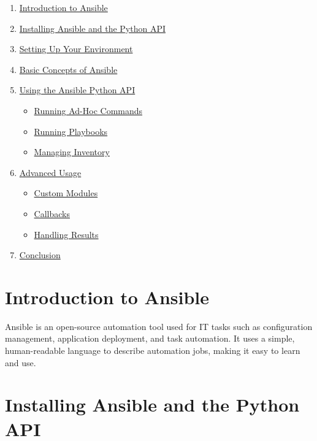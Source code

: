 \documentclass[
  letterpaper,
  DIV=11,
  numbers=noendperiod]{scrreprt}
\providecommand{\tightlist}{%
  \setlength{\itemsep}{0pt}\setlength{\parskip}{0pt}}\usepackage{longtable,booktabs,array}
\begin{document}
\begin{enumerate}
\def\labelenumi{\arabic{enumi}.}
\tightlist
\item
  \hyperref[introduction-to-ansible]{Introduction to Ansible}
\item
  \hyperref[installing-ansible-and-the-python-api]{Installing Ansible
  and the Python API}
\item
  \hyperref[setting-up-your-environment]{Setting Up Your Environment}
\item
  \hyperref[basic-concepts-of-ansible]{Basic Concepts of Ansible}
\item
  \hyperref[using-the-ansible-python-api]{Using the Ansible Python API}

  \begin{itemize}
  \tightlist
  \item
    \hyperref[running-ad-hoc-commands]{Running Ad-Hoc Commands}
  \item
    \hyperref[running-playbooks]{Running Playbooks}
  \item
    \hyperref[managing-inventory]{Managing Inventory}
  \end{itemize}
\item
  \hyperref[advanced-usage]{Advanced Usage}

  \begin{itemize}
  \tightlist
  \item
    \hyperref[custom-modules]{Custom Modules}
  \item
    \hyperref[callbacks]{Callbacks}
  \item
    \hyperref[handling-results]{Handling Results}
  \end{itemize}
\item
  \hyperref[conclusion]{Conclusion}
\end{enumerate}

\section{Introduction to Ansible}\label{introduction-to-ansible}

Ansible is an open-source automation tool used for IT tasks such as
configuration management, application deployment, and task automation.
It uses a simple, human-readable language to describe automation jobs,
making it easy to learn and use.

\section{Installing Ansible and the Python
API}\label{installing-ansible-and-the-python-api}
\end{document}
